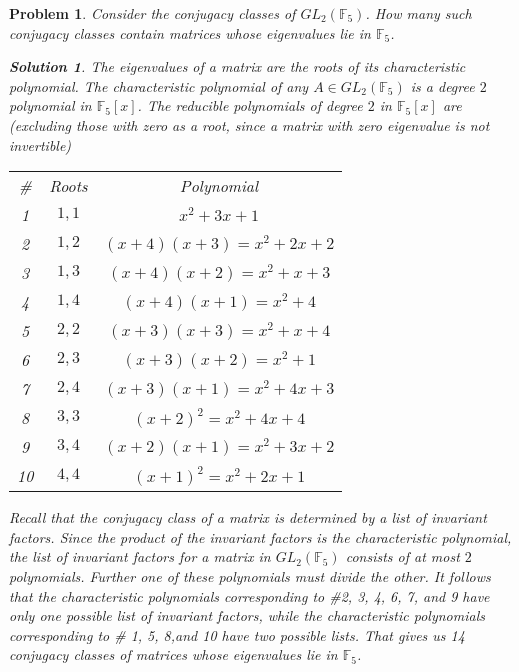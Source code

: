 \documentclass[11pt]{article}
\newcommand{\1}{\textbf{1}}
\newtheorem{prob}{Problem}
\newtheorem*{sol*}{\textit{Solution}}
\begin{document}
\begin{prob}
Consider the conjugacy classes of $GL_2(\mathbb{F}_5)$. How many such conjugacy classes contain matrices whose eigenvalues lie in $\mathbb{F}_5$. 

\begin{sol*}
\textnormal{The eigenvalues of a matrix are the roots of its characteristic polynomial. The characteristic polynomial of any $A\in GL_2(\mathbb{F}_5)$ is a degree $2$ polynomial in $\mathbb{F}_5[x]$. The reducible polynomials of degree $2$ in $\mathbb{F}_5[x]$ are (excluding those with zero as a root, since a matrix with zero eigenvalue is not invertible)} \begin{center}
\begin{tabular}{c| c|c}
\# & Roots   & Polynomial  \\
1 & $1, 1$   &  $x^2 + 3x + 1$ \\
2 & $1, 2$   &  $(x+4)(x+3) = x^2 + 2x + 2$ \\
3 & $1, 3$   &  $(x+4)(x+2) = x^2 + x + 3$ \\
4 & $1, 4$   &  $(x+4)(x+1) = x^2 + 4$ \\
5 & $2, 2$   &  $(x+3)(x+3) = x^2 + x + 4$ \\
6 & $2, 3$   & $(x+3)(x+2) = x^2 + 1$ \\
7 & $2, 4$   & $(x+3)(x+1) = x^2 + 4x + 3$ \\
8 & $3, 3$   & $(x+2)^2 = x^2 + 4x + 4$ \\
9 & $3, 4$   & $(x+2)(x+1) = x^2 + 3x + 2$ \\
10 &$4, 4$   & $(x+1)^2 = x^2 + 2x + 1$
 
\end{tabular}
\end{center}

\textnormal{Recall that the conjugacy class of a matrix is determined by a list of invariant factors. Since the product of the invariant factors is the characteristic polynomial, the list of invariant factors for a matrix in $GL_2(\mathbb{F}_5)$ consists of at most $2$ polynomials. Further one of these polynomials must divide the other. It follows that the characteristic polynomials corresponding to \#2, 3, 4, 6, 7, and 9 have only one possible list of invariant factors, while the characteristic polynomials corresponding to \# 1, 5, 8,and 10 have two possible lists. That gives us 14 conjugacy classes of matrices whose eigenvalues lie in $\mathbb{F}_5$. 
}

\end{sol*}
\end{prob}
\end{document}
